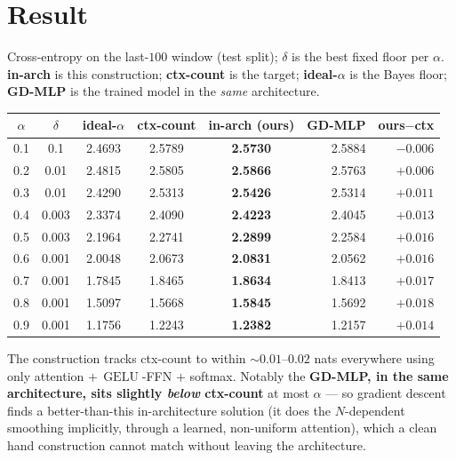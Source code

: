 \documentclass[11pt]{article}
\newcommand{\gelu}{\operatorname{GELU}}
\begin{document}
\section{Result}
Cross-entropy on the last-$100$ window (test split); $\delta$ is the best fixed floor per $\alpha$.
\textbf{in-arch} is this construction; \textbf{ctx-count} is the target; \textbf{ideal-$\alpha$} is the
Bayes floor; \textbf{GD-MLP} is the trained model in the \emph{same} architecture.
\begin{center}\small
\begin{tabular}{@{}cccccrr@{}}
\toprule
$\alpha$ & $\delta$ & ideal-$\alpha$ & ctx-count & \textbf{in-arch (ours)} & GD-MLP & ours$-$ctx\\
\midrule
0.1 & 0.1   & 2.4693 & 2.5789 & \textbf{2.5730} & 2.5884 & $-0.006$\\
0.2 & 0.01  & 2.4815 & 2.5805 & \textbf{2.5866} & 2.5763 & $+0.006$\\
0.3 & 0.01  & 2.4290 & 2.5313 & \textbf{2.5426} & 2.5314 & $+0.011$\\
0.4 & 0.003 & 2.3374 & 2.4090 & \textbf{2.4223} & 2.4045 & $+0.013$\\
0.5 & 0.003 & 2.1964 & 2.2741 & \textbf{2.2899} & 2.2584 & $+0.016$\\
0.6 & 0.001 & 2.0048 & 2.0673 & \textbf{2.0831} & 2.0562 & $+0.016$\\
0.7 & 0.001 & 1.7845 & 1.8465 & \textbf{1.8634} & 1.8413 & $+0.017$\\
0.8 & 0.001 & 1.5097 & 1.5668 & \textbf{1.5845} & 1.5692 & $+0.018$\\
0.9 & 0.001 & 1.1756 & 1.2243 & \textbf{1.2382} & 1.2157 & $+0.014$\\
\bottomrule
\end{tabular}
\end{center}
The construction tracks ctx-count to within $\sim 0.01$–$0.02$ nats everywhere using only
attention $+\,\gelu$-FFN $+$ softmax. Notably the \textbf{GD-MLP, in the same architecture, sits slightly
\emph{below} ctx-count} at most $\alpha$ --- so gradient descent finds a better-than-this in-architecture
solution (it does the $N$-dependent smoothing implicitly, through a learned, non-uniform attention), which
a clean hand construction cannot match without leaving the architecture.
\end{document}

